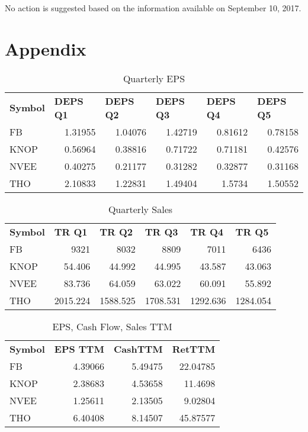 \documentclass{article}
\begin{document}
No action is suggested based on the information available on September 10, 2017.

\section{Appendix}
\begin{table}[htbp]
  \caption{Quarterly EPS}
    \begin{tabular}{lrrrrr}
    \textbf{Symbol} & \multicolumn{1}{l}{\textbf{DEPS Q1}} & \multicolumn{1}{l}{\textbf{DEPS Q2}} & \multicolumn{1}{l}{\textbf{DEPS Q3}} & \multicolumn{1}{l}{\textbf{DEPS Q4}} & \multicolumn{1}{l}{\textbf{DEPS Q5}} \\
    FB    & 1.31955 & 1.04076 & 1.42719 & 0.81612 & 0.78158 \\
    KNOP  & 0.56964 & 0.38816 & 0.71722 & 0.71181 & 0.42576 \\
    NVEE  & 0.40275 & 0.21177 & 0.31282 & 0.32877 & 0.31168 \\
    THO   & 2.10833 & 1.22831 & 1.49404 & 1.5734 & 1.50552 \\
    \end{tabular}%
  \label{tab:addlabel}%
\end{table}%

\begin{table}[htbp]
  \caption{Quarterly Sales}
    \begin{tabular}{lrrrrr}
    \textbf{Symbol} & \multicolumn{1}{l}{\textbf{TR Q1}} & \multicolumn{1}{l}{\textbf{TR Q2}} & \multicolumn{1}{l}{\textbf{TR Q3}} & \multicolumn{1}{l}{\textbf{TR Q4}} & \multicolumn{1}{l}{\textbf{TR Q5}} \\
    FB    & 9321  & 8032  & 8809  & 7011  & 6436 \\
    KNOP  & 54.406 & 44.992 & 44.995 & 43.587 & 43.063 \\
    NVEE  & 83.736 & 64.059 & 63.022 & 60.091 & 55.892 \\
    THO   & 2015.224 & 1588.525 & 1708.531 & 1292.636 & 1284.054 \\
    \end{tabular}%
  \label{tab:addlabel}%
\end{table}%

\begin{table}[htbp]
  \caption{EPS, Cash Flow, Sales TTM}
    \begin{tabular}{lrrr}
    \textbf{Symbol} & \multicolumn{1}{l}{\textbf{EPS TTM}} & \multicolumn{1}{l}{\textbf{CashTTM}} & \multicolumn{1}{l}{\textbf{RetTTM}} \\
    FB    & 4.39066 & 5.49475 & 22.04785 \\
    KNOP  & 2.38683 & 4.53658 & 11.4698 \\
    NVEE  & 1.25611 & 2.13505 & 9.02804 \\
    THO   & 6.40408 & 8.14507 & 45.87577 \\
    \end{tabular}%
  \label{tab:addlabel}%
\end{table}%
\end{document}
